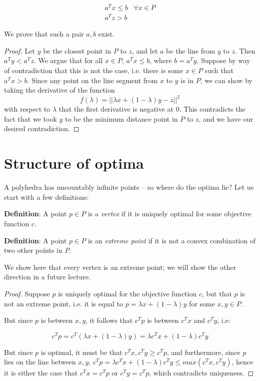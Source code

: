 \documentclass{article}
\begin{document}
\begin{eqnarray*}
  a^T x \leq b & \forall x \in P\\
  a^T z > b
\end{eqnarray*}

We prove that such a pair $a,b$ exist.

\begin{proof}
  Let $y$ be the closest point in $P$ to $z$, and let $a$ be the line
  from $y$ to $z$.  Then $a^T y < a^T z$.  We argue that for all $x
  \in P$, $a^T x \leq b$, where $b = a^T y$.  Suppose by way of
  contradiction that this is not the case, i.e. there is some $x \in
  P$ such that $a^T x > b$.  Since any point on the line segment from
  $x$ to $y$ is in $P$, we can show by taking the derivative of the
  function
  $$f(\lambda) = ||\lambda x + (1-\lambda) y - z||^2$$
  with respect to
  $\lambda$ that the first derivative is negative at $0$.  This
  contradicts the fact that we took $y$ to be the minimum distance
  point in $P$ to $z$, and we have our desired contradiction.
\end{proof}

\section{Structure of optima}

A polyhedra has uncountably infinite points -- so where do the optima
lie?  Let us start with a few definitions:

\textbf{Definition}:
  A point $p \in P$ is a \emph{vertex} if it is uniquely optimal for
  some objective function $c$.

\textbf{Definition}:
  A point $p \in P$ is an \emph{extreme point} if it is not a convex
  combination of two other points in $P$.

We show here that every vertex is an extreme point; we will show the
other direction in a future lecture.

\begin{proof}
  Suppose $p$ is uniquely optimal for the objective function $c$, but
  that $p$ is not an extreme point, i.e. it is equal to $p = \lambda x
  + (1-\lambda)y$ for some $x,y \in P$.
  
  But since $p$ is between $x,y$, it follows that $c^T p$ is between
  $c^T x$ and $c^T y$, i.e:
  
  $$
  c^T p = c^T (\lambda x + (1-\lambda) y) = \lambda c^T x +
  (1-\lambda) c^T y$$
  
  But since $p$ is optimal, it must be that $c^T x, c^T y \geq c^T p$,
  and furthermore, since $p$ lies on the line between $x,y$, $c^T p = \lambda c^T x + (1-\lambda) c^T y \leq max(c^T x, c^T y)$, hence it is
  either the case that $c^T x = c^T p$ or $c^T y = c^T p$, which
  contradicts uniqueness.
\end{proof}
\end{document}
